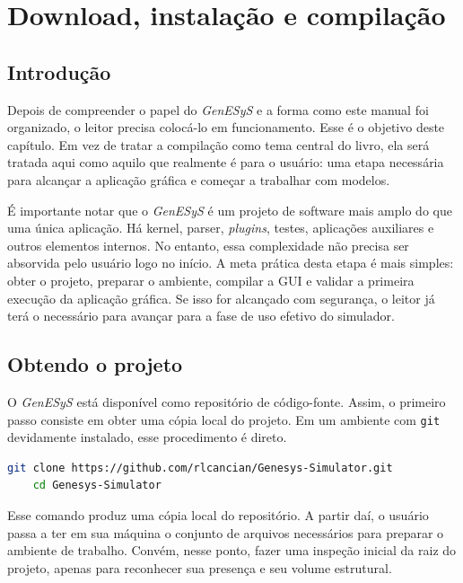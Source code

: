 \chapter{Download, instalação e compilação}
\label{chap:download_instalacao_compilacao}

\section{Introdução}
\label{sec:cap2_introducao}

Depois de compreender o papel do \textit{GenESyS} e a forma como este manual foi organizado, o leitor precisa colocá-lo em funcionamento. Esse é o objetivo deste capítulo. Em vez de tratar a compilação como tema central do livro, ela será tratada aqui como aquilo que realmente é para o usuário: uma etapa necessária para alcançar a aplicação gráfica e começar a trabalhar com modelos.

É importante notar que o \textit{GenESyS} é um projeto de software mais amplo do que uma única aplicação. Há kernel, parser, \textit{plugins}, testes, aplicações auxiliares e outros elementos internos. No entanto, essa complexidade não precisa ser absorvida pelo usuário logo no início. A meta prática desta etapa é mais simples: obter o projeto, preparar o ambiente, compilar a GUI e validar a primeira execução da aplicação gráfica. Se isso for alcançado com segurança, o leitor já terá o necessário para avançar para a fase de uso efetivo do simulador.

\section{Obtendo o projeto}
\label{sec:cap2_obtendo_projeto}

O \textit{GenESyS} está disponível como repositório de código-fonte. Assim, o primeiro passo consiste em obter uma cópia local do projeto. Em um ambiente com \texttt{git} devidamente instalado, esse procedimento é direto.

\begin{lstlisting}[language=bash,caption={Clonagem inicial do repositório do GenESyS},label={lst:cap2_git_clone}]
    git clone https://github.com/rlcancian/Genesys-Simulator.git
    cd Genesys-Simulator
\end{lstlisting}

Esse comando produz uma cópia local do repositório. A partir daí, o usuário passa a ter em sua máquina o conjunto de arquivos necessários para preparar o ambiente de trabalho. Convém, nesse ponto, fazer uma inspeção inicial da raiz do projeto, apenas para reconhecer sua presença e seu volume estrutural.

